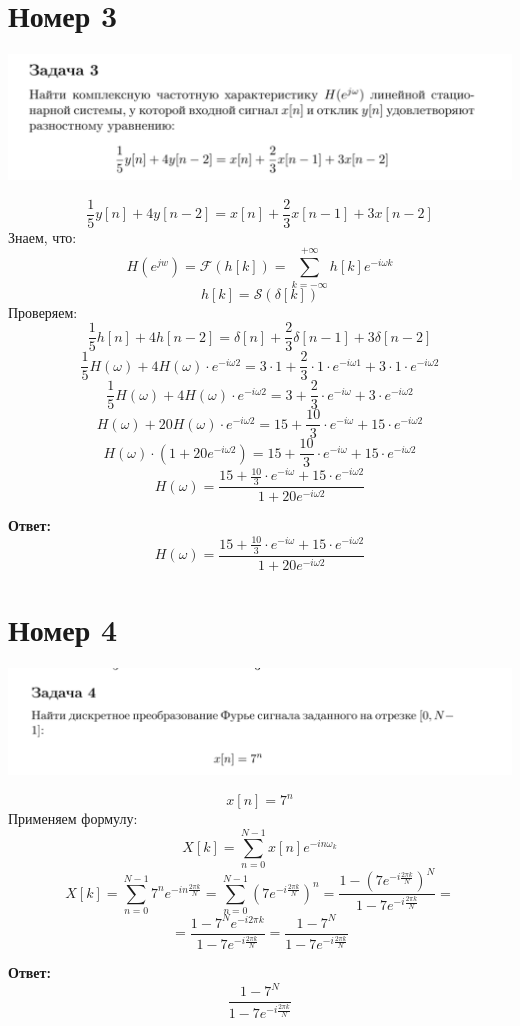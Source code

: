 \documentclass[a4paper,12pt]{article}
\begin{document}
\section*{Номер 3}
\begin{center}
\includegraphics[scale=0.4]{3.png}
\end{center}
\[
\frac15 y[n] + 4y[n-2] = x[n] + \frac23 x[n-1] + 3x[n-2]
\]
Знаем, что:
\[
H(e^{jw}) = \mathcal{F} \left( h[k] \right) = \sum_{k = -\infty}^{+\infty} h[k] e^{-i \omega k}
\]
\[
h[k] = \mathcal{S} (\delta [k])
\]
Проверяем:
\[
\frac15 h[n] + 4h[n-2] = \delta[n] + \frac23 \delta[n-1] + 3\delta[n-2]
\]
\[
\frac15 H(\omega) + 4 H(\omega) \cdot e^{-i \omega 2}
=
3 \cdot 1 + \frac23 \cdot 1 \cdot e^{-i \omega 1} + 3 \cdot 1 \cdot e^{-i \omega 2}
\]
\[
\frac15 H(\omega) + 4 H(\omega) \cdot e^{-i \omega 2} = 3 + \frac{2}{3} \cdot e^{- i \omega} + 3 \cdot e^{-i \omega 2}
\]
\[
H(\omega) + 20H(\omega) \cdot e^{-i \omega 2} = 15 + \frac{10}{3} \cdot e^{- i \omega} + 15 \cdot e^{-i \omega 2}
\]
\[
H(\omega) \cdot (1 + 20 e^{-i\omega2}) = 15 + \frac{10}{3} \cdot e^{- i \omega} + 15 \cdot e^{-i \omega 2}
\]
\[
H(\omega) = \frac{15 + \frac{10}{3} \cdot e^{- i \omega} + 15 \cdot e^{-i \omega 2}}{1 + 20 e^{-i\omega2}}
\]
\begin{center}
\textbf{Ответ: } 
\[
H(\omega) = \frac{15 + \frac{10}{3} \cdot e^{- i \omega} + 15 \cdot e^{-i \omega 2}}{1 + 20 e^{-i\omega2}}
\]
\end{center}
\clearpage
\section*{Номер 4}
\begin{center}
\includegraphics[scale=0.4]{4.png}
\end{center}
\[
x[n] = 7^n
\]
Применяем формулу:
\[
X[k] = \sum_{n = 0}^{N - 1} x[n] e^{-i n \omega_k}
\]
\[
X[k] = \sum_{n = 0}^{N - 1} 7^n e^{-i n \frac{2 \pi k}{N}} =
\sum_{n = 0}^{N - 1}
\left(
7 e^{-i \frac{2 \pi k}{N}}
\right)^n
=
\frac{1 - \left( 7 e^{-i \frac{2 \pi k}{N}} \right)^N}{1 - 7 e^{-i \frac{2 \pi k}{N}}} =
\]
\[
=
\frac{1 - 7^N e^{-i 2 \pi k}}{1 - 7 e^{-i \frac{2 \pi k}{N}}}  =
\frac{1 - 7^N}{1 - 7 e^{-i \frac{2 \pi k}{N}}}
\]
\begin{center}
\textbf{Ответ: } 
\[
\frac{1 - 7^N}{1 - 7 e^{-i \frac{2 \pi k}{N}}}
\]
\end{center}
\end{document}
